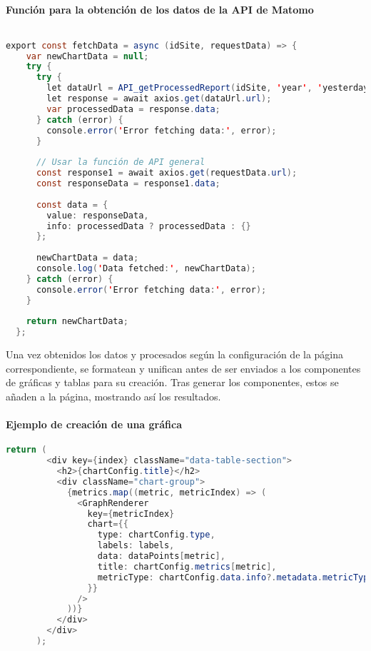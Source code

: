 \paragraph{Función para la obtención de los datos de la API de Matomo}
\begin{lstlisting}[language=Java]
    
export const fetchData = async (idSite, requestData) => {
    var newChartData = null;
    try {
      try {
        let dataUrl = API_getProcessedReport(idSite, 'year', 'yesterday', requestData.module, requestData.action, language);
        let response = await axios.get(dataUrl.url);
        var processedData = response.data;
      } catch (error) {
        console.error('Error fetching data:', error);
      }
  
      // Usar la función de API general
      const response1 = await axios.get(requestData.url);
      const responseData = response1.data;
  
      const data = {
        value: responseData,
        info: processedData ? processedData : {}
      };
  
      newChartData = data;
      console.log('Data fetched:', newChartData);
    } catch (error) {
      console.error('Error fetching data:', error);
    }
  
    return newChartData;
  };
\end{lstlisting}


Una vez obtenidos los datos y procesados según la configuración de la página correspondiente, se formatean y unifican antes de ser enviados 
a los componentes de gráficas y tablas para su creación. Tras generar los componentes, estos se añaden a la página, mostrando así los resultados.


\paragraph{Ejemplo de creación de una gráfica}
\begin{lstlisting}[language=Java]
    return (
        <div key={index} className="data-table-section">
          <h2>{chartConfig.title}</h2>
          <div className="chart-group">
            {metrics.map((metric, metricIndex) => (
              <GraphRenderer
                key={metricIndex}
                chart={{
                  type: chartConfig.type,
                  labels: labels,
                  data: dataPoints[metric],
                  title: chartConfig.metrics[metric],
                  metricType: chartConfig.data.info?.metadata.metricTypes[metric] || 'number',
                }}
              />
            ))}
          </div>
        </div>
      );
\end{lstlisting}

